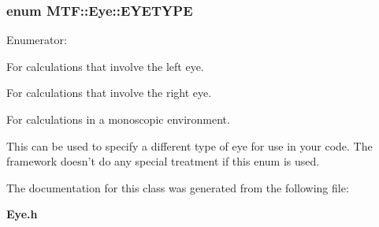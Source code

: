 \subsubsection[{\-E\-Y\-E\-T\-Y\-P\-E}]{\setlength{\rightskip}{0pt plus 5cm}enum {\bf \-M\-T\-F\-::\-Eye\-::\-E\-Y\-E\-T\-Y\-P\-E}}\label{class_m_t_f_1_1_eye_aaf574fe254192c8a903d487cfa849477}
\begin{Desc}
\item[\-Enumerator\-: ]\par
\begin{description}
\item[{\em 
\-L\-E\-F\-T\label{class_m_t_f_1_1_eye_aaf574fe254192c8a903d487cfa849477a3d239e18526dfdc0a5bc240808a3165b}
}]\-For calculations that involve the left eye. \item[{\em 
\-R\-I\-G\-H\-T\label{class_m_t_f_1_1_eye_aaf574fe254192c8a903d487cfa849477af6fe633552a0fa2337909381aaf0cea1}
}]\-For calculations that involve the right eye. \item[{\em 
\-M\-O\-N\-O\label{class_m_t_f_1_1_eye_aaf574fe254192c8a903d487cfa849477ac51e6f341536a2ca715a0d2d7c6299cf}
}]\-For calculations in a monoscopic environment. \item[{\em 
\-N\-O\-N\-E\label{class_m_t_f_1_1_eye_aaf574fe254192c8a903d487cfa849477a380f27c555552c5cd5f8e18e9cc37eda}
}]\-This can be used to specify a different type of eye for use in your code. \-The framework doesn't do any special treatment if this enum is used. \end{description}
\end{Desc}



\-The documentation for this class was generated from the following file\-:\begin{DoxyCompactItemize}
\item 
{\bf \-Eye.\-h}\end{DoxyCompactItemize}
